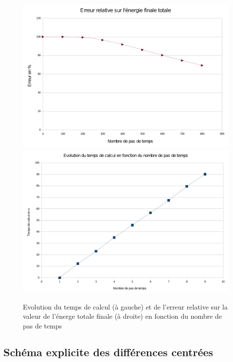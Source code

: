 \documentclass[]{article}
\begin{document}
\begin{figure}
\begin{center}
 \includegraphics[scale=0.32]{Figures/Erreur.pdf}
\includegraphics[scale=0.32]{Figures/temps.pdf}
\caption{Evolution du temps de calcul (à gauche) et de l'erreur relative
 sur la valeur de l'énerge totale finale (à droite) en fonction du nombre de
pas de temps}
\label{analimp}
\end{center}
\end{figure}

\subsection{Schéma explicite des différences centrées}
\end{document}
